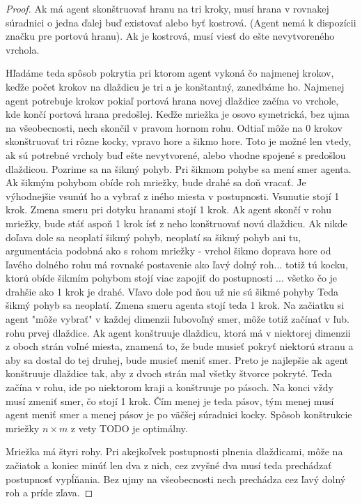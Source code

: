 \begin{proof}
Ak má agent skonštruovať hranu na tri kroky, musí hrana v rovnakej súradnici
o jedna ďalej buď existovať alebo byť kostrová. (Agent nemá k dispozícii
značku pre portovú hranu). Ak je kostrová, musí viesť do ešte nevytvoreného
vrchola.



Hľadáme teda spôsob pokrytia pri ktorom agent vykoná čo najmenej krokov,
keďže počet krokov na dlaždicu je tri a je konštantný, zanedbáme ho.
Najmenej agent potrebuje krokov pokiaľ portová hrana novej dlaždice začína
vo vrchole, kde končí portová hrana predošlej.
Keďže mriežka je osovo symetrická, bez ujma na všeobecnosti, nech skončil v
pravom hornom rohu. Odtiaľ môže na 0 krokov skonštruovať tri rôzne kocky, 
vpravo hore a šikmo hore. Toto je možné len vtedy, ak sú potrebné vrcholy
buď ešte nevytvorené, alebo vhodne spojené s predošlou dlaždicou.
Pozrime sa na šikmý pohyb. 
Pri šikmom pohybe sa mení smer agenta. Ak šikmým pohybom obíde roh mriežky,
bude drahé sa doň vracať. Je výhodnejšie vsunúť ho a vybrať z iného miesta v
postupnosti. Vsunutie stojí 1 krok.
Zmena smeru pri dotyku hranami stojí 1 krok. Ak agent skončí v rohu mriežky,
bude stáť aspoň 1 krok ísť z neho konštruovať novú dlaždicu. Ak nikde doľava
dole sa neoplatí šikmý pohyb, neoplatí sa šikmý pohyb ani tu, argumentácia
podobná ako s rohom mriežky - vrchol šikmo doprava hore od ľavého dolného
rohu má rovnaké postavenie ako ľavý dolný roh... totiž tú kocku, ktorú obíde šikmím pohybom
stojí viac zapojiť do postupnosti ... všetko čo je drahšie ako 1 krok je
drahé. Vľavo dole pod ňou už nie sú šikmé pohyby
Teda šikmý pohyb sa neoplatí. Zmena smeru agenta stojí teda 1 krok. Na
začiatku si agent "môže vybrať" v každej dimenzii ľubovoľný smer, môže totiž
začínať v ľub. rohu prvej dlaždice.
Ak agent konštruuje dlaždicu, ktorá má v niektorej dimenzii z oboch strán
voľné miesta, znamená to, že bude musieť pokryť niektorú stranu a aby sa
dostal do tej druhej, bude musieť meniť smer. Preto je najlepšie ak agent
konštruuje dlaždice tak, aby z dvoch strán mal všetky štvorce pokryté. Teda
začína v rohu, ide po niektorom kraji a konštruuje po pásoch. Na konci vždy
musí zmeniť smer, čo stojí 1 krok. Čím menej je teda pásov, tým	menej musí
agent meniť smer a menej pásov je po väčšej súradnici kocky.
Spôsob konštrukcie mriežky $n \times m$ z vety TODO je optimálny.





Mriežka má štyri rohy. Pri akejkoľvek postupnosti plnenia dlaždicami, môže
na začiatok a koniec minúť len dva z nich, cez zvyšné dva musí teda
prechádzať postupnosť vypĺňania. Bez ujmy na všeobecnosti nech prechádza cez
ľavý dolný roh a príde zľava.



\end{proof}

